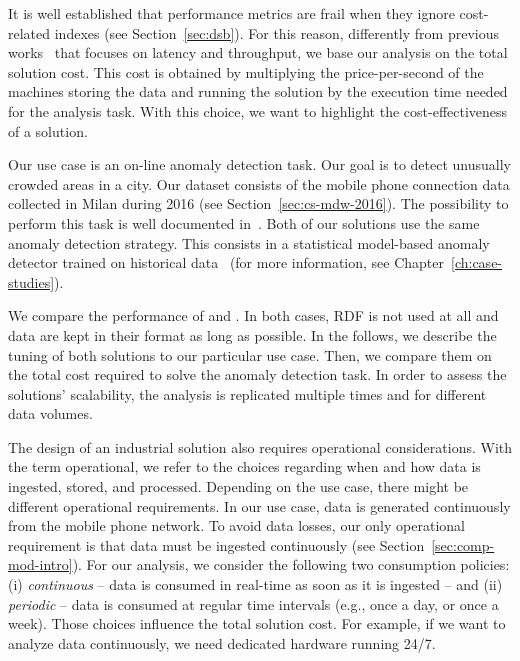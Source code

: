 {It is well established that performance metrics are frail when they ignore cost-related indexes (see Section~\ref{sec:dsb}). For this reason, differently from previous works~\cite{arasu2004linear,chintapalli2016benchmarking} that focuses on latency and throughput, we base our analysis on the total solution cost. This cost is obtained by multiplying the price-per-second of the machines storing the data and running the solution by the execution time needed for the analysis task. With this choice, we want to highlight the cost-effectiveness of a solution.

Our use case is an on-line anomaly detection task. Our goal is to detect unusually crowded areas in a city. Our dataset consists of the mobile phone connection data collected in Milan during 2016 (see Section~\ref{sec:cs-mdw-2016}). The possibility to perform this task is well documented in~\cite{krings2009urban,calabrese2010geography,calabrese2011real}. Both of our solutions use the same anomaly detection strategy. This consists in a statistical model-based anomaly detector trained on historical data~\cite{DBLP:journals/ieeemm/BalduiniVALAC15} (for more information, see Chapter~\ref{ch:case-studies}). 

We compare the performance of \sparkdi{} and \sti{}.
In both cases, RDF is not used at all and data are kept in their format as long as possible.
In the follows, we describe the tuning of both solutions to our particular use case. Then, we compare them on the total cost required to solve the anomaly detection task. In order to assess the solutions' scalability, the analysis is replicated multiple times and for different data volumes.

The design of an industrial solution also requires operational considerations. With the term operational, we refer to the choices regarding when and how data is ingested, stored, and processed. Depending on the use case, there might be different operational requirements. In our use case, data is generated continuously from the mobile phone network. To avoid data losses, our only operational requirement is that data must be ingested continuously (see Section~\ref{sec:comp-mod-intro}). For our analysis, we consider the following two consumption policies: (i) \textit{continuous} -- data is consumed in real-time as soon as it is ingested -- and (ii) \textit{periodic} -- data is consumed at regular time intervals (e.g., once a day, or  once a week). Those choices influence the total solution cost. For example, if we want to analyze data continuously, we need dedicated hardware running 24/7.

}
